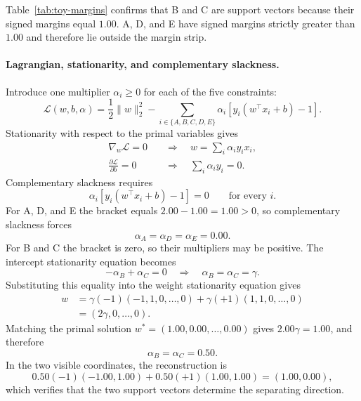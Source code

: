 \documentclass[11pt,a4paper]{article}
\numberwithin{equation}{section} %
\begin{document}
Table~\ref{tab:toy-margins} confirms that B and C are support vectors because
their signed margins equal $1.00$. A, D, and E have signed margins strictly
greater than $1.00$ and therefore lie outside the margin strip.

\paragraph{Lagrangian, stationarity, and complementary slackness.}
Introduce one multiplier $\alpha_i\geq0$ for each of the five constraints:
\begin{equation}
    \mathcal{L}(w,b,\alpha)
    =\frac12\lVert w\rVert_2^2
    -\sum_{i\in\{A,B,C,D,E\}}
       \alpha_i\left[y_i(w^\top x_i+b)-1\right].
\end{equation}
Stationarity with respect to the primal variables gives
\begin{equation}
\begin{aligned}
\nabla_w\mathcal{L}=0
&\quad\Longrightarrow\quad
w=\sum_i\alpha_i y_i x_i,\\
\frac{\partial\mathcal{L}}{\partial b}=0
&\quad\Longrightarrow\quad
\sum_i\alpha_i y_i=0.
\end{aligned}
\end{equation}
Complementary slackness requires
\begin{equation}
    \alpha_i\left[y_i(w^\top x_i+b)-1\right]=0
    \qquad\text{for every }i.
\end{equation}
For A, D, and E the bracket equals $2.00-1.00=1.00>0$, so complementary
slackness forces
\begin{equation}
    \alpha_A=\alpha_D=\alpha_E=0.00.
\end{equation}
For B and C the bracket is zero, so their multipliers may be positive. The
intercept stationarity equation becomes
\begin{equation}
    -\alpha_B+\alpha_C=0
    \quad\Longrightarrow\quad \alpha_B=\alpha_C=\gamma.
\end{equation}
Substituting this equality into the weight stationarity equation gives
\begin{equation}
\begin{aligned}
w
&=\gamma(-1)(-1,1,0,\ldots,0)
  +\gamma(+1)(1,1,0,\ldots,0)\\
&=(2\gamma,0,\ldots,0).
\end{aligned}
\end{equation}
Matching the primal solution $w^*=(1.00,0.00,\ldots,0.00)$ gives
$2.00\gamma=1.00$, and therefore
\begin{equation}
    \alpha_B=\alpha_C=0.50.
\end{equation}
In the two visible coordinates, the reconstruction is
\begin{equation}
    0.50(-1)(-1.00,1.00)+0.50(+1)(1.00,1.00)=(1.00,0.00),
\end{equation}
which verifies that the two support vectors determine the separating
direction.
\end{document}
